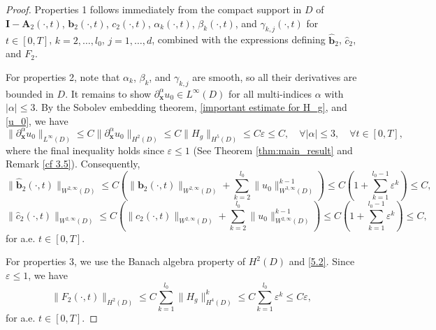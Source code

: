 \documentclass[11pt,reqno,oneside]{amsart}
\numberwithin{equation}{section}
\theoremstyle{definition}
\theoremstyle{remark}
\numberwithin{equation}{section}
\begin{document}
	\begin{proof}
		Properties 1 follows immediately from the compact support in $D$ of $\mathbf{I} - \mathbf{A}_2(\cdot, t)$, $\mathbf{b}_2(\cdot, t)$, $c_2(\cdot, t)$, $\alpha_k(\cdot, t)$, $\beta_k(\cdot, t)$, and $\gamma_{k,j}(\cdot, t)$ for $t \in [0, T]$, $k = 2, \dots, l_0$, $j = 1, \dots, d$, combined with the expressions defining $\hat{\mathbf{b}}_2$, $\hat{c}_2$, and $F_2$.
		
		For properties 2, note that $\alpha_k$, $\beta_k$, and $\gamma_{k,j}$ are smooth, so all their derivatives are bounded in $D$. It remains to show $\partial_{\mathbf{x}}^{\alpha} u_0 \in L^{\infty}(D)$ for all multi-indices $\alpha$ with $|\alpha| \leqslant 3$. By the Sobolev embedding theorem, \eqref{important estimate for H_g}, and \eqref{u_0}, we have
		\begin{equation}\label{5.2}
			\|\partial_{\mathbf{x}}^{\alpha} u_0\|_{L^{\infty}(D)} \leqslant C \|\partial_{\mathbf{x}}^{\alpha} u_0\|_{H^{2}(D)} \leqslant C \|H_g\|_{H^5(D)} \leqslant C \varepsilon \leqslant C, \quad \forall |\alpha| \leqslant 3, \quad \forall t \in [0, T],
		\end{equation}
		where the final inequality holds since $\varepsilon \leqslant 1$ (See Theorem \ref{thm:main_result} and Remark \ref{cf 3.5}). Consequently,
		\begin{equation*}
			\|\hat{\mathbf{b}}_2(\cdot, t)\|_{W^{2,\infty}(D)} \leqslant C \left( \|\mathbf{b}_2(\cdot, t)\|_{W^{2,\infty}(D)} + \sum_{k=2}^{l_0} \|u_0\|_{W^{3,\infty}(D)}^{k-1} \right) \leqslant C \left( 1 + \sum_{k=1}^{l_0-1} \varepsilon^{k} \right) \leqslant C,
		\end{equation*}
		\begin{equation*}
			\|\hat{c}_2(\cdot, t)\|_{W^{2,\infty}(D)}\leqslant  C \left( \|c_2(\cdot, t)\|_{W^{2,\infty}(D)} + \sum_{k=2}^{l_0} \|u_0\|_{W^{2,\infty}(D)}^{k-1} \right) \leqslant C \left( 1 + \sum_{k=1}^{l_0-1} \varepsilon^{k} \right) \leqslant C,
		\end{equation*}
		for a.e. $t \in [0, T]$.
		
		For properties 3, we use the Banach algebra property of $H^2(D)$ and \eqref{5.2}. Since $\varepsilon \leqslant 1$, we have
		\begin{equation}\label{F_2}
			\|F_2(\cdot, t)\|_{H^{2}(D)} \leqslant C \sum_{k=1}^{l_0} \|H_g\|_{H^4(D)}^k \leqslant C \sum_{k=1}^{l_0} \varepsilon^k \leqslant C \varepsilon,
		\end{equation}
		for a.e. $t \in [0, T]$. 
	\end{proof}
	
\end{document}
